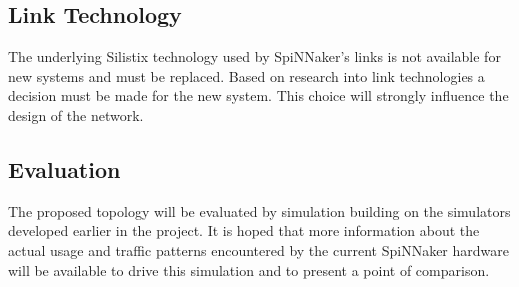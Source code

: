 		\subsection{Link Technology}
			
			
			The underlying Silistix technology used by SpiNNaker's links is not
			available for new systems and must be replaced. Based on research into
			link technologies a decision must be made for the new system. This choice
			will strongly influence the design of the network.
		
		
		\subsection{Evaluation}
			
			The proposed topology will be evaluated by simulation building on the
			simulators developed earlier in the project. It is hoped that more
			information about the actual usage and traffic patterns encountered by the
			current SpiNNaker hardware will be available to drive this simulation and
			to present a point of comparison.
		

